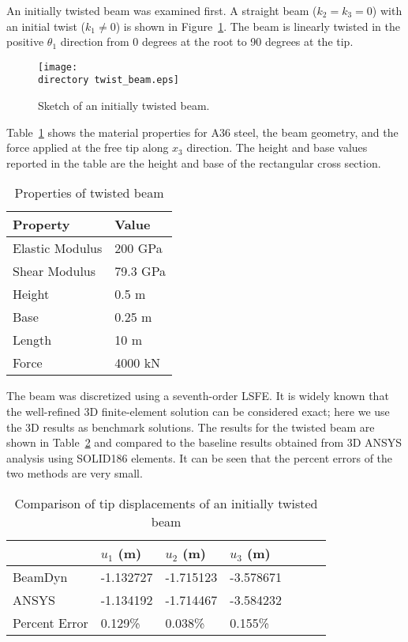 \documentclass{aiaa-tc}
\def\directory{EPSF/}
\begin{document}
An initially twisted beam was examined first. A straight beam ($k_2=k_3=0$) with an initial twist ($k_1\neq 0$) is shown in Figure~\ref{Twist1}. The beam is linearly twisted in the positive $\theta_1$ direction from 0 degrees at the root to 90 degrees at the tip.
\begin{figure}
\centering
\texttt{[image: \\directory twist\_beam.eps]}
\caption{Sketch of an initially twisted beam.} 
\label{Twist1}
\end{figure}
 Table~\ref{E1Property} shows the material properties for A36 steel, the beam geometry, and the force applied at the free tip along $x_3$ direction. The height and base values reported in the table are the height and base of the rectangular cross section. 
 \begin{table}
\caption{\label{E1Property} Properties of twisted beam}
\begin{center}
    \begin{tabular}{| l | l |}
    	\hline
    	Property               & Value   \\ \hline
    	Elastic Modulus                      & 200 GPa \\ \hline
    	Shear Modulus                      & 79.3 GPa \\ \hline
    	Height                      & 0.5 m   \\ \hline
    	Base                      & 0.25 m  \\ \hline
    	Length                      & 10 m    \\ \hline
    	Force                      & 4000 kN \\ \hline
    \end{tabular}
\end{center}
\end{table}
The beam was discretized using a seventh-order LSFE. It is widely known that the well-refined 3D finite-element solution can be considered exact; here we use the 3D results as benchmark solutions. The results for the twisted beam are shown in Table~\ref{E1u} and compared to the baseline results obtained from 3D ANSYS analysis using SOLID186 elements. It can be seen that the percent errors of the two methods are very small.
\begin{table}
\caption{\label{E1u} Comparison of tip displacements of an initially twisted beam} 
\begin{center} 
    \begin{tabular}{| l | l | l | l | l | l | l |}
    	\hline
    	        & $u_1$ (m) & $u_2$ (m) & $u_3$ (m)  \\ \hline
    	BeamDyn  & -1.132727     & -1.715123       & -3.578671      \\  \hline
    	ANSYS   & -1.134192     & -1.714467      & -3.584232     \\ \hline
    	Percent Error   & 0.129\%     & 0.038\%      & 0.155\%     \\ \hline
    \end{tabular}
\end{center}
\end{table} 
\end{document}
